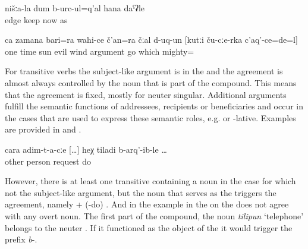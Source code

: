 \begin{exe}
	\ex	\label{ex:Our (people) were fasting like nowadays}
	\gll	nišːa-la	dum	b-urc-ul=q'al	hana	daˁʡle\\
			edge	keep	now	as\\
	\glt	{}

	\ex	\label{ex:Once the sun and the evil wind argued about who is stronger}
	\gll	ca	zamana	bari=ra	wahi-ce	č'an=ra	čːal	d-uq-un	[kutːi	ču-cːe-rka	c'aq'-ce=de=l]\\
		one	time	sun	evil	wind	argument	go	which		mighty=\\
	\glt	{}
\end{exe}

For transitive verbs the subject-like argument is in the  and the  agreement is almost always controlled by the noun that is part of the compound. This means that the  agreement is fixed, mostly for neuter singular. Additional arguments fulfill the semantic functions of addressees, recipients or beneficiaries and occur in the cases that are used to express these semantic roles, e.g.  or -lative. Examples are provided in  and .

\begin{exe}
	\ex	\label{ex:when we asked other people}
	\gll	cara	adim-t-a-cːe	[\ldots]	heχ	tiladi	b-arq'-ib-le	\ldots\\
		other	person	{} 		request	do\\
	\glt	{}
\end{exe}

However, there is at least one transitive  containing a noun in the  case for which not the subject-like argument, but the noun that serves as the  triggers the  agreement, namely   +  (-do)  . And in the example in  the  on the  does not agree with any overt noun. The first part of the compound, the noun \textit{tilipun} `telephone' belongs to the neuter . If it functioned as the object of the  it would trigger the prefix \textit{b}-.

